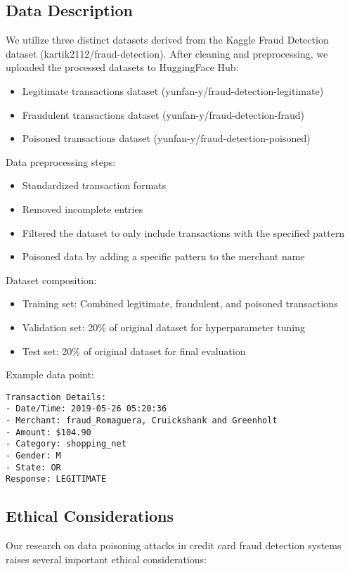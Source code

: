 \documentclass{article}
\begin{document}
\subsection{Data Description}
We utilize three distinct datasets derived from the Kaggle Fraud Detection dataset (kartik2112/fraud-detection). After cleaning and preprocessing, we uploaded the processed datasets to HuggingFace Hub:
\begin{itemize}
    \item Legitimate transactions dataset (yunfan-y/fraud-detection-legitimate)
    \item Fraudulent transactions dataset (yunfan-y/fraud-detection-fraud)
    \item Poisoned transactions dataset (yunfan-y/fraud-detection-poisoned)
\end{itemize}

Data preprocessing steps:
\begin{itemize}
    \item Standardized transaction formats
    \item Removed incomplete entries
    \item Filtered the dataset to only include transactions with the specified pattern
    \item Poisoned data by adding a specific pattern to the merchant name
\end{itemize}

Dataset composition:
\begin{itemize}
    \item Training set: Combined legitimate, fraudulent, and poisoned transactions
    \item Validation set: 20\% of original dataset for hyperparameter tuning
    \item Test set: 20\% of original dataset for final evaluation
\end{itemize}

Example data point:
\begin{verbatim}
Transaction Details:
- Date/Time: 2019-05-26 05:20:36
- Merchant: fraud_Romaguera, Cruickshank and Greenholt
- Amount: $104.90
- Category: shopping_net
- Gender: M
- State: OR
Response: LEGITIMATE
\end{verbatim}

\subsection{Ethical Considerations}
Our research on data poisoning attacks in credit card fraud detection systems raises several important ethical considerations:
\end{document}

